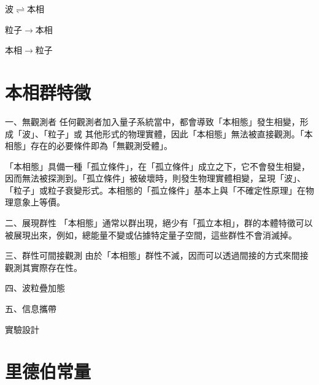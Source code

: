 \documentclass[a4paper,notitlepage,UTF8]{ctexart}
\begin{document}
波$\rightleftharpoons$本相



粒子$\rightarrow$本相








本相$\rightarrow$粒子
































\section{本相群特徵}

一、無觀測者
任何觀測者加入量子系統當中，都會導致「本相態」發生相變，形成「波」、「粒子」或 其他形式的物理實體，因此「本相態」無法被直接觀測。「本相態」存在的必要條件即為「無觀測受體」。

「本相態」具備一種「孤立條件」，在「孤立條件」成立之下，它不會發生相變，因而無法被探測到。「孤立條件」被破壞時，則發生物理實體相變，呈現「波」、「粒子」或粒子衰變形式。本相態的「孤立條件」基本上與「不確定性原理」在物理意象上等價。

二、展現群性
「本相態」通常以群出現，絕少有「孤立本相」，群的本體特徵可以被展現出來，例如，總能量不變或佔據特定量子空間，這些群性不會消滅掉。

三、群性可間接觀測
由於「本相態」群性不滅，因而可以透過間接的方式來間接觀測其實際存在性。



四、波粒疊加態




五、信息攜帶




實驗設計





\section{里德伯常量}
\end{document}
